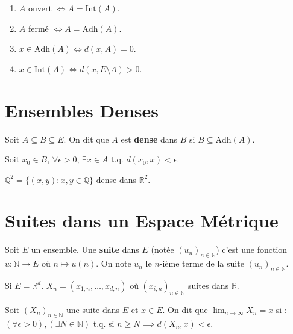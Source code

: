 \documentclass[oneside]{book}
\begin{document}
\begin{proposition}
\begin{enumerate}
    \item $A$ ouvert $\iff A = \text{Int}(A)$.
    \item $A$ fermé $\iff A = \text{Adh}(A)$.
    \item $x \in \text{Adh}(A) \iff d(x, A) = 0$.
    \item $x \in \text{Int}(A) \iff d(x, E \setminus A) > 0$.
\end{enumerate}
\end{proposition}

\section{Ensembles Denses}

\begin{definition}
Soit $A \subseteq B \subseteq E$. On dit que $A$ est \textbf{dense} dans $B$ si $B \subseteq \text{Adh}(A)$.
\end{definition}

Soit $x_0 \in B$, $\forall \epsilon > 0$, $\exists x \in A$ t.q. $d(x_0, x) < \epsilon$.

\begin{example}
$\mathbb{Q}^2 = \{(x, y) : x, y \in \mathbb{Q}\}$ dense dans $\mathbb{R}^2$.
\end{example}


\section{Suites dans un Espace Métrique}

\begin{definition}
Soit $E$ un ensemble. Une \textbf{suite} dans $E$ (notée $(u_n)_{n \in \mathbb{N}}$) c'est une fonction $u : \mathbb{N} \to E$ où $n \mapsto u(n)$.
On note $u_n$ le $n$-ième terme de la suite $(u_n)_{n \in \mathbb{N}}$.

Si $E = \mathbb{R}^d$.
$X_n = (x_{1,n}, \dots, x_{d,n})$ où $(x_{i,n})_{n \in \mathbb{N}}$ suites dans $\mathbb{R}$.
\end{definition}

\begin{definition}
Soit $(X_n)_{n \in \mathbb{N}}$ une suite dans $E$ et $x \in E$. On dit que $\lim_{n \to \infty} X_n = x$ si :
$(\forall \epsilon > 0), (\exists N \in \mathbb{N})$ t.q. si $n \geq N \implies d(X_n, x) < \epsilon$.
\end{definition}
\end{document}
